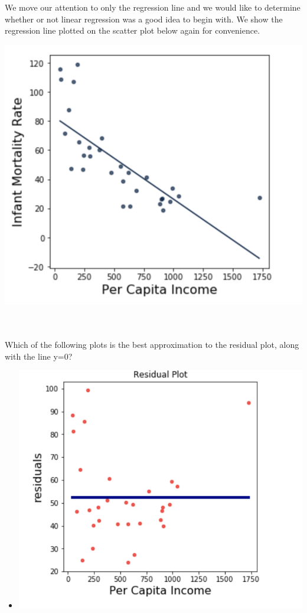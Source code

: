 \begin{enumerate}
\\ \\
We move our attention to only the regression line and we would like to determine whether or not linear regression was a good idea to begin with. We show the regression line plotted on the scatter plot below again for convenience. \\
\begin{center}
\includegraphics[scale=0.6]{regline.png}
\end{center} \\ \\
 Which of the following plots is the best approximation to the residual plot, along with the line y=0?
\begin{multicols}{3}
\begin{itemize}[label=\bubble]
\item \includegraphics[scale=0.4]{resid2.png}

\end{itemize}
\end{multicols}
\end{enumerate}
